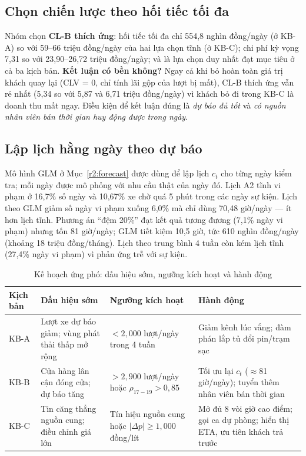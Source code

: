 {\subsection{Chọn chiến lược theo hối tiếc tối đa}
Nhóm chọn \textbf{CL-B thích ứng}: hối tiếc tối đa chỉ 554,8 nghìn đồng/ngày
(ở KB-A) so với 59--66 triệu đồng/ngày của hai lựa chọn tĩnh (ở KB-C); chi phí kỳ
vọng 7,31 so với 23,90--26,72 triệu đồng/ngày; và là lựa chọn duy nhất đạt mục
tiêu ở cả ba kịch bản.
\textbf{Kết luận có bền không?} Ngay cả khi bỏ hoàn toàn giá trị khách quay lại
(CLV = 0, chỉ tính lãi gộp của lượt bị mất), CL-B thích ứng vẫn rẻ nhất
(5,34 so với 5,87 và 6,71 triệu đồng/ngày) vì khách bỏ đi trong KB-C là doanh
thu mất ngay. Điều kiện để kết luận đúng là \emph{dự báo đủ tốt} và \emph{có
nguồn nhân viên bán thời gian huy động được trong ngày}.

\subsection{Lập lịch hằng ngày theo dự báo}
\label{r3:ml-staff}
Mô hình GLM ở Mục~\ref{r2:forecast} được dùng để lập lịch $c_t$ cho từng ngày
kiểm tra; mỗi ngày được mô phỏng với nhu cầu thật của ngày đó.
Lịch A2 tĩnh vi phạm ở 16,7\% số ngày và 10,67\% xe chờ quá 5 phút trong các
ngày sự kiện. Lịch theo GLM giảm số ngày vi phạm xuống 6,0\% mà chỉ dùng 70,48
giờ/ngày --- ít hơn lịch tĩnh. Phương án ``đệm 20\%'' đạt kết quả tương đương
(7,1\% ngày vi phạm) nhưng tốn 81 giờ/ngày; GLM tiết kiệm 10,5 giờ, tức 610
nghìn đồng/ngày (khoảng 18 triệu đồng/tháng). Lịch theo trung bình 4 tuần còn
kém lịch tĩnh (27,4\% ngày vi phạm) vì phản ứng trễ với sự kiện.

\begin{table}[htbp]\centering\small
\caption{Kế hoạch ứng phó: dấu hiệu sớm, ngưỡng kích hoạt và hành động}\label{r3:playbook}
\begin{tabularx}{\linewidth}{@{}p{14mm}Y Y Y@{}}
\toprule
Kịch bản & Dấu hiệu sớm & Ngưỡng kích hoạt & Hành động \\
\midrule
KB-A & Lượt xe dự báo giảm; vùng phát thải thấp mở rộng & $<2{,}000$ lượt/ngày trong 4 tuần & Giảm kênh lúc vắng; đàm phán lắp tủ đổi pin/trạm sạc~\cite{vgx} \\
KB-B & Cửa hàng lân cận đóng cửa; dự báo tăng & $>2{,}900$ lượt/ngày hoặc $\rho_{17-19}>0{,}85$ & Tối ưu lại $c_t$ ($\approx$81 giờ/ngày); tuyển thêm nhân viên bán thời gian \\
KB-C & Tin căng thẳng nguồn cung; điều chỉnh giá lớn & Tín hiệu nguồn cung hoặc $|\Delta p|\ge1{,}000$ đồng/lít & Mở đủ 8 vòi giờ cao điểm; gọi ca dự phòng; hiển thị ETA, ưu tiên khách trả trước \\
\bottomrule
\end{tabularx}
\end{table}

}
